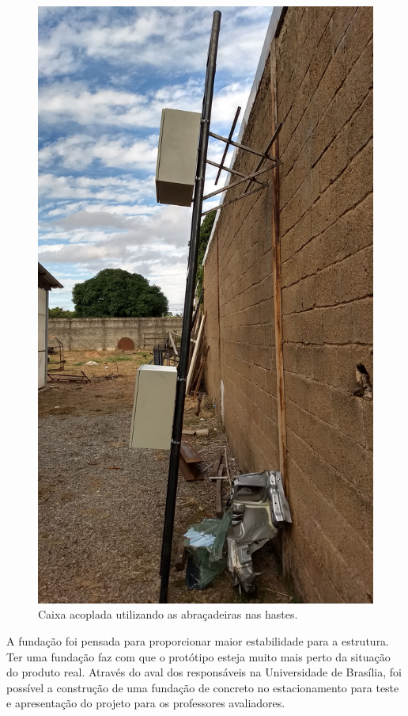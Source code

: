 \begin{figure}[H]
	\centering
    \includegraphics[keepaspectratio=true,scale=0.12]{figuras/estrucomp2.jpg}
    \caption{Caixa acoplada utilizando as abraçadeiras nas hastes.}
    \label{caixaacop}
\end{figure}


A fundação foi pensada para proporcionar maior estabilidade para a estrutura. Ter uma fundação faz com que o protótipo esteja muito mais perto da situação do produto real. Através do aval dos responsáveis na Universidade de Brasília, foi possível a construção de uma fundação de concreto no estacionamento para teste e apresentação do projeto para os professores avaliadores. 

